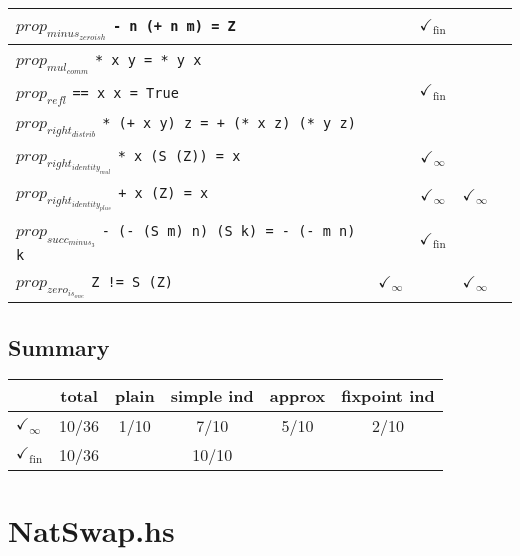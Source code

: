 \documentclass{article}
\begin{document}
\begin{longtable}{p{10cm} || c | c | c | c | }
\hline
$prop_{minus_{zeroish}}$ \newline \verb`- n (+ n m) = Z` &  & $\checkmark_{\mathrm{fin}}$ &  &  \\
\hline
$prop_{mul_{comm}}$ \newline \verb`* x y = * y x` &  &  &  &  \\
\hline
$prop_{refl}$ \newline \verb`== x x = True` &  & $\checkmark_{\mathrm{fin}}$ &  &  \\
\hline
$prop_{right_{distrib}}$ \newline \verb`* (+ x y) z = + (* x z) (* y z)` &  &  &  &  \\
\hline
$prop_{right_{identity_{mul}}}$ \newline \verb`* x (S (Z)) = x` &  & $\checkmark_{\infty}$ &  &  \\
\hline
$prop_{right_{identity_{plus}}}$ \newline \verb`+ x (Z) = x` &  & $\checkmark_{\infty}$ & $\checkmark_{\infty}$ &  \\
\hline
$prop_{succ_{minus_{3}}}$ \newline \verb`- (- (S m) n) (S k) = - (- m n) k` &  & $\checkmark_{\mathrm{fin}}$ &  &  \\
\hline
$prop_{zero_{is_{one}}}$ \newline \verb`Z != S (Z)` & $\checkmark_{\infty}$ &  & $\checkmark_{\infty}$ &  \\
\end{longtable}

\subsection*{Summary}
\begin{longtable}{p{4cm} || c | c | c | c | c | }
  & total & plain & simple ind & approx & fixpoint ind \\
\hline
$\checkmark_{\infty}$ & 10/36 & 1/10 & 7/10 & 5/10 & 2/10\\
\hline
$\checkmark_{\mathrm{fin}}$ & 10/36 &  & 10/10 &  & \\
\end{longtable}

\section*{NatSwap.hs}
\end{document}
